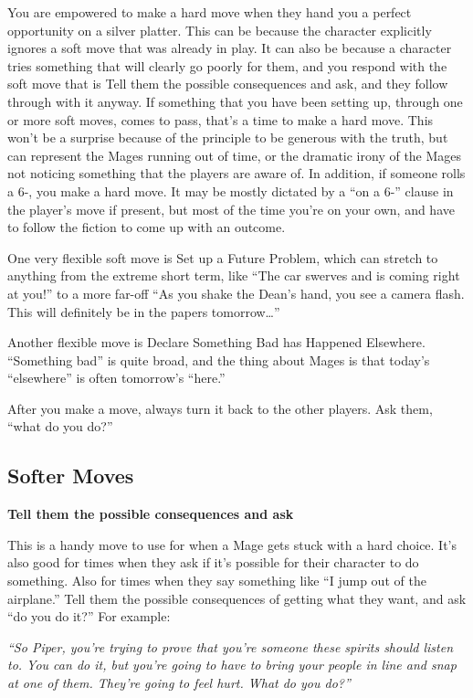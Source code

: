 \documentclass[
  oneside,
  statementpaper,
  9pt]{memoir}
\begin{document}
You are empowered to make a hard move when they hand you a perfect
opportunity on a silver platter. This can be because the character
explicitly ignores a soft move that was already in play. It can also be
because a character tries something that will clearly go poorly for
them, and you respond with the soft move that is Tell them the possible
consequences and ask, and they follow through with it anyway. If
something that you have been setting up, through one or more soft moves,
comes to pass, that's a time to make a hard move. This won't be a
surprise because of the principle to be generous with the truth, but can
represent the Mages running out of time, or the dramatic irony of the
Mages not noticing something that the players are aware of. In addition,
if someone rolls a 6-, you make a hard move. It may be mostly dictated
by a ``on a 6-'' clause in the player's move if present, but most of the
time you're on your own, and have to follow the fiction to come up with
an outcome.

One very flexible soft move is Set up a Future Problem, which can
stretch to anything from the extreme short term, like ``The car swerves
and is coming right at you!'' to a more far-off ``As you shake the
Dean's hand, you see a camera flash. This will definitely be in the
papers tomorrow\ldots{}''

Another flexible move is Declare Something Bad has Happened Elsewhere.
``Something bad'' is quite broad, and the thing about Mages is that
today's ``elsewhere'' is often tomorrow's ``here.''

After you make a move, always turn it back to the other players. Ask
them, ``what do you do?''

\hypertarget{softer-moves}{%
\subsection{Softer Moves}\label{softer-moves}}

\textbf{Tell them the possible consequences and ask}

This is a handy move to use for when a Mage gets stuck with a hard
choice. It's also good for times when they ask if it's possible for
their character to do something. Also for times when they say something
like ``I jump out of the airplane.'' Tell them the possible consequences
of getting what they want, and ask ``do you do it?'' For example:

\emph{``So Piper, you're trying to prove that you're someone these
spirits should listen to. You can do it, but you're going to have to
bring your people in line and snap at one of them. They're going to feel
hurt. What do you do?''}
\end{document}
